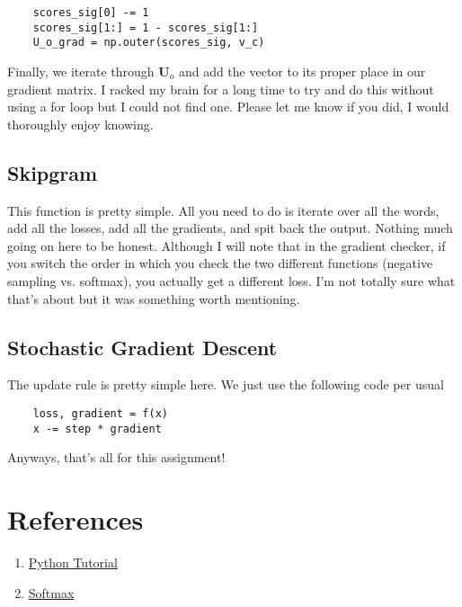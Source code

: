 \documentclass[12pt]{article}
\begin{document}
\begin{verbatim}
    scores_sig[0] -= 1
    scores_sig[1:] = 1 - scores_sig[1:]
    U_o_grad = np.outer(scores_sig, v_c)
\end{verbatim}
Finally, we iterate through $\bm U_o$ and add the vector to its proper place in our 
gradient matrix. I racked my brain for a long time to try and do this without using 
a for loop but I could not find one. Please let me know if you did, I would thoroughly 
enjoy knowing. 

\subsection{Skipgram}
This function is pretty simple. All you need to do is iterate over all the words, add 
all the losses, add all the gradients, and spit back the output. Nothing much going on 
here to be honest. Although I will note that in the gradient checker, if you switch 
the order in which you check the two different functions (negative sampling vs. softmax), 
you actually get a different loss. I'm not totally sure what that's about but it was something 
worth mentioning. 

\subsection{Stochastic Gradient Descent}
The update rule is pretty simple here. We just use the following code 
per usual
\begin{verbatim}
    loss, gradient = f(x)
    x -= step * gradient
\end{verbatim}
Anyways, that's all for this assignment!


\section{References}
\begin{enumerate}
    \item \href{https://cs231n.github.io/python-numpy-tutorial/}{Python Tutorial}
    \item \href{https://cs231n.github.io/linear-classify/#softmax-classifier}{Softmax}
\end{enumerate}
\end{document}
